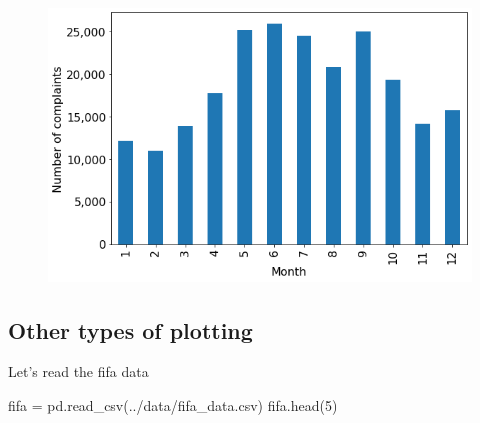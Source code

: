 \documentclass[
  letterpaper,
  DIV=11,
  numbers=noendperiod]{scrreprt}
\newenvironment{Shaded}{\begin{snugshade}}{\end{snugshade}}
\newcommand{\DecValTok}[1]{\textcolor[rgb]{0.68,0.00,0.00}{#1}}
\newcommand{\NormalTok}[1]{\textcolor[rgb]{0.00,0.23,0.31}{#1}}
\newcommand{\OperatorTok}[1]{\textcolor[rgb]{0.37,0.37,0.37}{#1}}
\newcommand{\StringTok}[1]{\textcolor[rgb]{0.13,0.47,0.30}{#1}}
\begin{document}
\begin{figure}[H]

{\centering \includegraphics{Data visualization_files/figure-pdf/cell-21-output-1.png}

}

\end{figure}

\hypertarget{other-types-of-plotting}{%
\subsection{Other types of plotting}\label{other-types-of-plotting}}

Let's read the fifa data

\begin{Shaded}
\begin{Highlighting}[]
\NormalTok{fifa }\OperatorTok{=}\NormalTok{ pd.read\_csv(}\StringTok{\textquotesingle{}../data/fifa\_data.csv\textquotesingle{}}\NormalTok{)}
\NormalTok{fifa.head(}\DecValTok{5}\NormalTok{)}
\end{Highlighting}
\end{Shaded}
\end{document}
